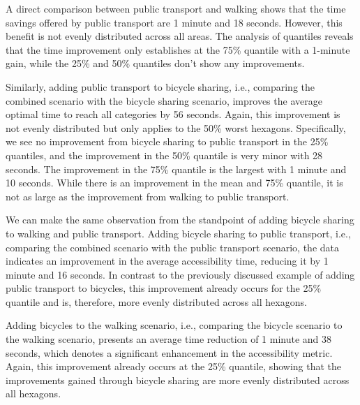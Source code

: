 A direct comparison between public transport and walking shows that the time savings offered by public transport are 1 minute and 18 seconds. 
However, this benefit is not evenly distributed across all areas.
The analysis of quantiles reveals that the time improvement only establishes at the 75\% quantile with a 1-minute gain, while the 25\% and 50\% quantiles don't show any improvements.

Similarly, adding public transport to bicycle sharing, i.e., comparing the combined scenario with the bicycle sharing scenario, improves the average optimal time to reach all categories by 56 seconds.
Again, this improvement is not evenly distributed but only applies to the 50\% worst hexagons.
Specifically, we see no improvement from bicycle sharing to public transport in the 25\% quantiles, and the improvement in the 50\% quantile is very minor with 28 seconds.
The improvement in the 75\% quantile is the largest with 1 minute and 10 seconds.
While there is an improvement in the mean and 75\% quantile, it is not as large as the improvement from walking to public transport.

We can make the same observation from the standpoint of adding bicycle sharing to walking and public transport.
Adding bicycle sharing to public transport, i.e., comparing the combined scenario with the public transport scenario, the data indicates an improvement in the average accessibility time, reducing it by 1 minute and 16 seconds.
In contrast to the previously discussed example of adding public transport to bicycles, this improvement already occurs for the 25\% quantile and is, therefore, more evenly distributed across all hexagons.

Adding bicycles to the walking scenario, i.e., comparing the bicycle scenario to the walking scenario, presents an average time reduction of 1 minute and 38 seconds, which denotes a significant enhancement in the accessibility metric. 
Again, this improvement already occurs at the 25\% quantile, showing that the improvements gained through bicycle sharing are more evenly distributed across all hexagons.

